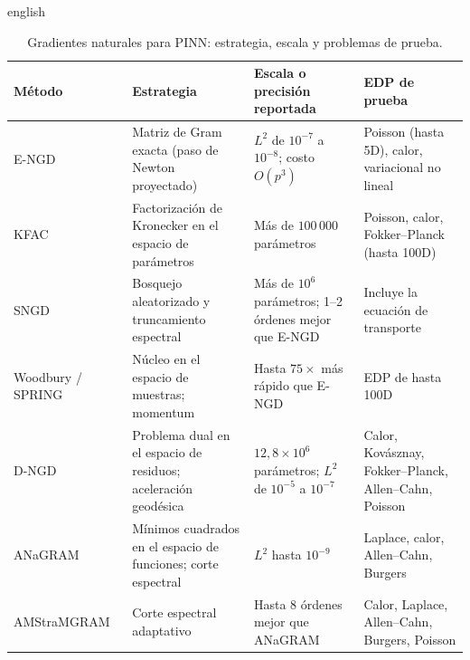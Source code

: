 \documentclass[../0000.tex]{subfiles}
\begin{document}
\begin{hyphenrules}{english}
\begin{table}[htbp]
\centering\small
\caption{Gradientes naturales para PINN: estrategia, escala y problemas de prueba.}
\label{tab:ea-ngd}
\begin{tabularx}{\textwidth}{@{}l Y Y Y@{}}
\toprule
Método & Estrategia & Escala o precisión reportada & EDP de prueba \\
\midrule
E-NGD~\cite{muller2023achieving} & Matriz de Gram exacta (paso de Newton proyectado) & $L^2$ de $10^{-7}$ a $10^{-8}$; costo $O(p^3)$ & Poisson (hasta 5D), calor, variacional no lineal \\
KFAC~\cite{dangel2024kronecker} & Factorización de Kronecker en el espacio de parámetros & Más de $100\,000$ parámetros & Poisson, calor, Fokker--Planck (hasta 100D) \\
SNGD~\cite{mckay2025near} & Bosquejo aleatorizado y truncamiento espectral & Más de $10^6$ parámetros; 1--2 órdenes mejor que E-NGD & Incluye la ecuación de transporte \\
Woodbury / SPRING~\cite{guzman2025improving} & Núcleo en el espacio de muestras; momentum & Hasta $75\times$ más rápido que E-NGD & EDP de hasta 100D \\
D-NGD~\cite{jnini2025dual} & Problema dual en el espacio de residuos; aceleración geodésica & $12{,}8\times10^6$ parámetros; $L^2$ de $10^{-5}$ a $10^{-7}$ & Calor, Kovásznay, Fokker--Planck, Allen--Cahn, Poisson \\
ANaGRAM~\cite{schwencke2024anagram} & Mínimos cuadrados en el espacio de funciones; corte espectral & $L^2$ hasta $10^{-9}$ & Laplace, calor, Allen--Cahn, Burgers \\
AMStraMGRAM~\cite{schwencke2025amstramgram} & Corte espectral adaptativo & Hasta 8 órdenes mejor que ANaGRAM & Calor, Laplace, Allen--Cahn, Burgers, Poisson \\
\bottomrule
\end{tabularx}
\end{table}


\end{hyphenrules}
\end{document}
